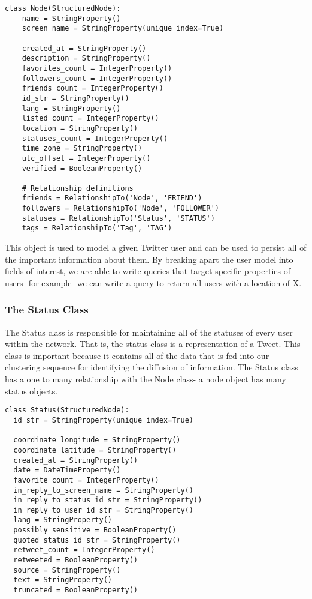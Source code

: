 \begin{lstlisting}
class Node(StructuredNode):
    name = StringProperty()
    screen_name = StringProperty(unique_index=True)
    
    created_at = StringProperty()
    description = StringProperty()
    favorites_count = IntegerProperty()
    followers_count = IntegerProperty()
    friends_count = IntegerProperty()
    id_str = StringProperty()
    lang = StringProperty()
    listed_count = IntegerProperty()
    location = StringProperty()
    statuses_count = IntegerProperty()
    time_zone = StringProperty()
    utc_offset = IntegerProperty()
    verified = BooleanProperty()
    
    # Relationship definitions
    friends = RelationshipTo('Node', 'FRIEND')
    followers = RelationshipTo('Node', 'FOLLOWER')
    statuses = RelationshipTo('Status', 'STATUS')
    tags = RelationshipTo('Tag', 'TAG')
\end{lstlisting}

This object is used to model a given Twitter user and can be used to
persist all of the important information about them. By breaking apart
the user model into fields of interest, we are able to write queries
that target specific properties of users- for example- we can write a
query to return all users with a location of X.

\subsubsection{The  Status Class}
The Status class is responsible for maintaining all of the statuses of
every user within the network. That is, the status class is a
representation of a Tweet. This class is important because it contains
all of the data that is fed into our clustering sequence for
identifying the diffusion of information. The Status class has a one
to many relationship with the Node class- a node object has many
status objects.

\begin{lstlisting}
class Status(StructuredNode):
  id_str = StringProperty(unique_index=True)

  coordinate_longitude = StringProperty()
  coordinate_latitude = StringProperty()
  created_at = StringProperty()
  date = DateTimeProperty()
  favorite_count = IntegerProperty()
  in_reply_to_screen_name = StringProperty()
  in_reply_to_status_id_str = StringProperty()
  in_reply_to_user_id_str = StringProperty()
  lang = StringProperty()
  possibly_sensitive = BooleanProperty()
  quoted_status_id_str = StringProperty()
  retweet_count = IntegerProperty()
  retweeted = BooleanProperty()
  source = StringProperty()
  text = StringProperty()
  truncated = BooleanProperty()
\end{lstlisting}

